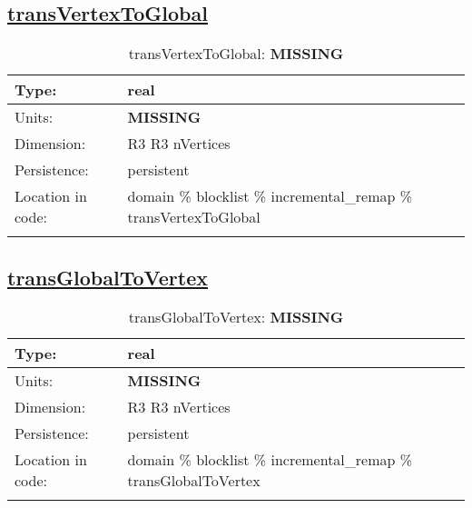 \subsection[transVertexToGlobal]{\hyperref[sec:var_tab_incremental_remap]{transVertexToGlobal}}
\label{subsec:var_sec_incremental_remap_transVertexToGlobal}
\begin{center}
\begin{longtable}{| p{2.0in} | p{4.0in} |}
        \hline 
        Type: & real \\
        \hline 
        Units: & {\bf \color{red} MISSING} \\
        \hline 
        Dimension: & R3 R3 nVertices \\
        \hline 
        Persistence: & persistent \\
        \hline 
         Location in code: & domain \% blocklist \% incremental\_remap \% transVertexToGlobal \\
         \hline 
    \caption{transVertexToGlobal: {\bf \color{red} MISSING}}
\end{longtable}
\end{center}
\subsection[transGlobalToVertex]{\hyperref[sec:var_tab_incremental_remap]{transGlobalToVertex}}
\label{subsec:var_sec_incremental_remap_transGlobalToVertex}
\begin{center}
\begin{longtable}{| p{2.0in} | p{4.0in} |}
        \hline 
        Type: & real \\
        \hline 
        Units: & {\bf \color{red} MISSING} \\
        \hline 
        Dimension: & R3 R3 nVertices \\
        \hline 
        Persistence: & persistent \\
        \hline 
         Location in code: & domain \% blocklist \% incremental\_remap \% transGlobalToVertex \\
         \hline 
    \caption{transGlobalToVertex: {\bf \color{red} MISSING}}
\end{longtable}
\end{center}
